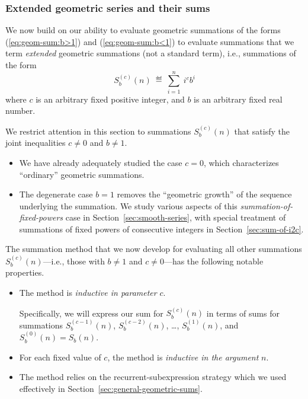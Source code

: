 \subsubsection{Extended geometric series and their sums}
\label{sec:extended-geom-series}

We now build on our ability to evaluate geometric summations of the forms (\ref{eq:geom-sum:b>1}) and (\ref{eq:geom-sum:b<1}) to evaluate summations that we term {\em extended} geometric summations (not a standard term), i.e., summations of the form
\[ S_b^{(c)}(n) \ \eqdef \ \sum_{i=1}^n \ i^c b^i \]
where $c$ is an arbitrary fixed positive integer, and $b$ is an arbitrary fixed real number.

\smallskip

We restrict attention in this section to summations $S_b^{(c)}(n)$ that satisfy the joint inequalities $c \neq 0$ and $b \neq 1$.

\medskip

\begin{itemize}
\item
We have already adequately studied the case $c=0$, which characterizes ``ordinary'' geometric summations.
\medskip\item
The degenerate case $b = 1$ removes the ``geometric growth'' of the sequence underlying the summation.  We study various aspects of this {\it summation-of-fixed-powers} case in Section~\ref{sec:smooth-series}, with special treatment of summations of fixed powers of consecutive integers in Section~\ref{sec:sum-of-i2c}.
\end{itemize}

\medskip

The summation method that we now develop for evaluating all other summations $S_b^{(c)}(n)$---i.e., those with $b \neq 1$ and $c \neq 0$---has the following notable properties.
\begin{itemize}
\item
The method is {\em inductive in parameter} $c$.

\smallskip

Specifically, we will express our sum for $S_b^{(c)}(n)$ in terms of sums for summations $S_b^{(c-1)}(n)$, $S_b^{(c-2)}(n)$, \ldots, $S_b^{(1)}(n)$, and $S_b^{(0)}(n) = S_b(n)$.

\medskip\item
For each fixed value of $c$, the method is {\em inductive in the argument} $n$.

\medskip\item
The method relies on the recurrent-subexpression strategy which we used effectively in Section~\ref{sec:general-geometric-sums}.
\end{itemize}

